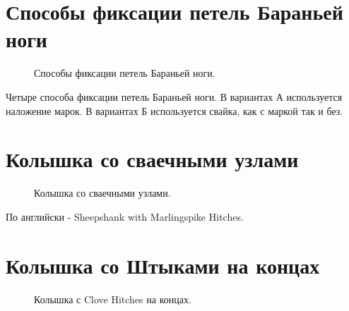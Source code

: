 \documentclass{artikel1}
\begin{document}
\section{Способы фиксации петель Бараньей ноги}

\begin{figure}[H]\centering
	\subfloat[С марками]{\label{ris:Fix_Sheepshank_Knot_1}
	\tcbox[enhanced jigsaw,colframe=black,opacityframe=0.5,opacityback=0.5]
		{\centering
			}
		}
\vfill
	\subfloat[Со свайками]{\label{ris:Fix_Sheepshank_Knot_2}
	\tcbox[enhanced jigsaw,colframe=black,opacityframe=0.5,opacityback=0.5]
		{\centering
			}
		}
	\caption{Способы фиксации петель Бараньей ноги.}\label{ris:Fix_Sheepshank_Knot}
\end{figure}

Четыре способа фиксации петель Бараньей ноги. В вариантах А используется наложение марок. В вариантах Б используется свайка, как с маркой так и без.

\section{Колышка со сваечными узлами}

\begin{figure}[H]\centering
\begin{minipage}{1\linewidth}
	\begin{center}
		\tcbox[enhanced jigsaw,colframe=black,opacityframe=0.5,opacityback=0.5]
		{\centering{}}
	\end{center}
\end{minipage}
\caption{Колышка со сваечными узлами.}
\label{ris:Sheepshank_with_Marlingspike_Hitches}
\end{figure}

По английски - Sheepshank with Marlingspike Hitches.

\section{Колышка со Штыками на концах}

\begin{figure}[H]\centering
	\begin{minipage}{1\linewidth}
		\begin{center}
			\tcbox[enhanced jigsaw,colframe=black,opacityframe=0.5,opacityback=0.5]
			{\centering{}}
		\end{center}
	\end{minipage}
\caption{Колышка с Clove Hitches на концах.}
\label{ris:Sheepshank_with_Clove_Hitches_at_each_end}
\end{figure}
\end{document}
